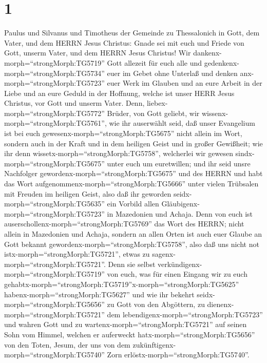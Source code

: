 \hypertarget{section}{%
\section{1}\label{section}}

 Paulus und Silvanus und Timotheus der Gemeinde zu
Thessalonich in Gott, dem Vater, und dem HERRN Jesus Christus: Gnade sei
mit euch und Friede von Gott, unserm Vater, und dem HERRN Jesus
Christus!  Wir dankenx-morph=``strongMorph:TG5719'' Gott
allezeit für euch alle und gedenkenx-morph=``strongMorph:TG5734'' euer
im Gebet ohne Unterlaß  und denken
anx-morph=``strongMorph:TG5723'' euer Werk im Glauben und an eure Arbeit
in der Liebe und an eure Geduld in der Hoffnung, welche ist unser HERR
Jesus Christus, vor Gott und unserm Vater.  Denn,
liebex-morph=``strongMorph:TG5772'' Brüder, von Gott geliebt, wir
wissenx-morph=``strongMorph:TG5761'', wie ihr auserwählt seid,
 daß unser Evangelium ist bei euch
gewesenx-morph=``strongMorph:TG5675'' nicht allein im Wort, sondern auch
in der Kraft und in dem heiligen Geist und in großer Gewißheit; wie ihr
denn wissetx-morph=``strongMorph:TG5758'', welcherlei wir gewesen
sindx-morph=``strongMorph:TG5675'' unter euch um euretwillen;
 und ihr seid unsre Nachfolger
gewordenx-morph=``strongMorph:TG5675'' und des HERRN und habt das Wort
aufgenommenx-morph=``strongMorph:TG5666'' unter vielen Trübsalen mit
Freuden im heiligen Geist,  also daß ihr geworden
seidx-morph=``strongMorph:TG5635'' ein Vorbild allen
Gläubigenx-morph=``strongMorph:TG5723'' in Mazedonien und Achaja.
 Denn von euch ist
auserschollenx-morph=``strongMorph:TG5769'' das Wort des HERRN; nicht
allein in Mazedonien und Achaja, sondern an allen Orten ist auch euer
Glaube an Gott bekannt gewordenx-morph=``strongMorph:TG5758'', also daß
uns nicht not istx-morph=``strongMorph:TG5721'', etwas zu
sagenx-morph=``strongMorph:TG5721''.  Denn sie selbst
verkündigenx-morph=``strongMorph:TG5719'' von euch, was für einen
Eingang wir zu euch
gehabtx-morph=``strongMorph:TG5719''\textbar x-morph=``strongMorph:TG5625''
habenx-morph=``strongMorph:TG5627'' und wie ihr bekehrt
seidx-morph=``strongMorph:TG5656'' zu Gott von den Abgöttern, zu
dienenx-morph=``strongMorph:TG5721'' dem
lebendigenx-morph=``strongMorph:TG5723'' und wahren Gott 
und zu wartenx-morph=``strongMorph:TG5721'' auf seinen Sohn vom Himmel,
welchen er auferweckt hatx-morph=``strongMorph:TG5656'' von den Toten,
Jesum, der uns von dem zukünftigenx-morph=``strongMorph:TG5740'' Zorn
erlöstx-morph=``strongMorph:TG5740''.

